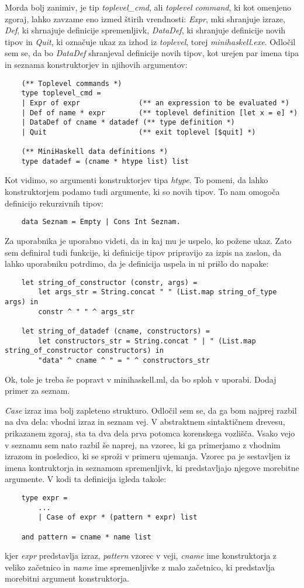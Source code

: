 \documentclass[12pt,a4paper,openany]{book}
\begin{document}
Morda bolj zanimiv, je tip \emph{toplevel_cmd}, ali \textit{toplevel command}, ki kot omenjeno zgoraj, lahko zavzame eno izmed štirih vrendnosti: \emph{Expr}, mki shranjuje izraze, 
\emph{Def}, ki shrnajuje definicije spremenljivk, \emph{DataDef}, ki shranjuje definicije novih tipov in \emph{Quit}, ki označuje ukaz za izhod iz \emph{toplevel}, torej 
\emph{minihaskell.exe}. Odločil sem se, da bo \emph{DataDef} shranjeval definicije novih tipov, kot urejen par imena tipa in seznama konstruktorjev in njihovih argumentov:
\begin{lstlisting}
	(** Toplevel commands *)
	type toplevel_cmd =
	| Expr of expr              (** an expression to be evaluated *)
	| Def of name * expr        (** toplevel definition [let x = e] *)
	| DataDef of cname * datadef (** type definition *)
	| Quit                      (** exit toplevel [$quit] *)
	
	(** MiniHaskell data definitions *)
	type datadef = (cname * htype list) list
\end{lstlisting}
Kot vidimo, so argumenti konstruktorjev tipa \emph{htype}. To pomeni, da lahko konstruktorjem podamo tudi argumente, ki so novih tipov. To nam omogoča definicijo rekurzivnih tipov:
\begin{lstlisting}
	data Seznam = Empty | Cons Int Seznam.
\end{lstlisting}

Za uporabnika je uporabno videti, da in kaj mu je uspelo, ko požene ukaz. Zato sem definiral tudi funkcije, ki definicije tipov pripravijo za izpis na zaslon, da lahko uporabniku 
potrdimo, da je definicija uspela in ni prišlo do napake:
\begin{lstlisting}
	let string_of_constructor (constr, args) =
		let args_str = String.concat " " (List.map string_of_type args) in 
		constr ^ " " ^ args_str

	let string_of_datadef (cname, constructors) =
		let constructors_str = String.concat " | " (List.map string_of_constructor constructors) in
		"data" ^ cname ^ " = " ^ constructors_str
\end{lstlisting}
Ok, tole je treba še popravt v minihaskell.ml, da bo sploh v uporabi. Dodaj primer za seznam.

\emph{Case} izraz ima bolj zapleteno strukturo. Odločil sem se, da ga bom najprej razbil na dva dela: vhodni izraz in seznam vej. V abstraktnem sintaktičnem drevesu, prikazanem zgoraj, 
sta ta dva dela prva potomca korenskega vozlišča. Vsako vejo v seznamu sem nato razbil še naprej, na vzorec, ki ga primerjamo z vhodnim izrazom in posledico, ki se sproži v primeru ujemanja. 
Vzorec pa je sestavljen iz imena kontruktorja in seznamom spremenljivk, ki predstavljajo njegove morebitne argumente. V kodi ta definicija igleda takole:
\begin{lstlisting}
	type expr =
  		...
  		| Case of expr * (pattern * expr) list

	and pattern = cname * name list
\end{lstlisting}
kjer \emph{expr} predstavlja izraz, \emph{pattern} vzorec v veji, \emph{cname} ime konstruktorja z veliko začetnico in \emph{name} ime spremenljivke z malo začetnico, ki predstavlja morebitni 
argument konstruktorja. 
\end{document}
